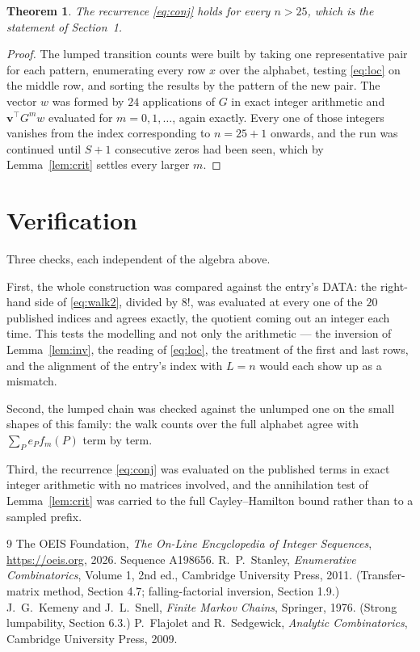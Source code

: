 \documentclass[11pt,a4paper]{article}
\theoremstyle{plain}
\newtheorem{theorem}{Theorem}
\theoremstyle{definition}
\begin{document}
\begin{theorem}
The recurrence \eqref{eq:conj} holds for every $n>25$, which is the statement of
Section~1.
\end{theorem}

\begin{proof}
The lumped transition counts were built by taking one representative pair for each pattern,
enumerating every row $x$ over the alphabet, testing \eqref{eq:loc} on the middle
row, and sorting the results by the pattern of the new pair. The vector $w$ was formed by
$24$ applications of $G$ in exact integer arithmetic and $\mathbf{v}^{\!\top}G^{m}w$
evaluated for $m=0,1,\dots$, again exactly. Every one of those integers vanishes from the
index corresponding to $n=25+1$ onwards, and the run was continued until $S+1$
consecutive zeros had been seen, which by Lemma~\ref{lem:crit} settles every larger $m$.
\end{proof}

\section{Verification}

Three checks, each independent of the algebra above.

First, the whole construction was compared against the entry's DATA: the right-hand side of
\eqref{eq:walk2}, divided by $8!$, was evaluated at every one of the $20$
published indices and agrees exactly, the quotient coming out an integer each time. This
tests the modelling and not only the arithmetic --- the inversion of Lemma~\ref{lem:inv},
the reading of \eqref{eq:loc}, the treatment of the first and last rows, and the
alignment of the entry's index with $L=n$ would each show up as a mismatch.

Second, the lumped chain was checked against the unlumped one on the small shapes of this
family: the walk counts over the full alphabet agree with $\sum_P e_Pf_m(P)$ term by term.

Third, the recurrence \eqref{eq:conj} was evaluated on the published terms in exact integer
arithmetic with no matrices involved, and the annihilation test of Lemma~\ref{lem:crit} was
carried to the full Cayley--Hamilton bound rather than to a sampled prefix.

\begin{thebibliography}{9}
 The OEIS Foundation, \emph{The On-Line Encyclopedia of Integer
Sequences}, \url{https://oeis.org}, 2026. Sequence A198656.
 R.~P.~Stanley, \emph{Enumerative Combinatorics}, Volume 1, 2nd ed.,
Cambridge University Press, 2011. (Transfer-matrix method, Section 4.7; falling-factorial
inversion, Section 1.9.)
 J.~G.~Kemeny and J.~L.~Snell, \emph{Finite Markov Chains}, Springer,
1976. (Strong lumpability, Section 6.3.)
 P.~Flajolet and R.~Sedgewick, \emph{Analytic Combinatorics}, Cambridge
University Press, 2009.
\end{thebibliography}
\end{document}

